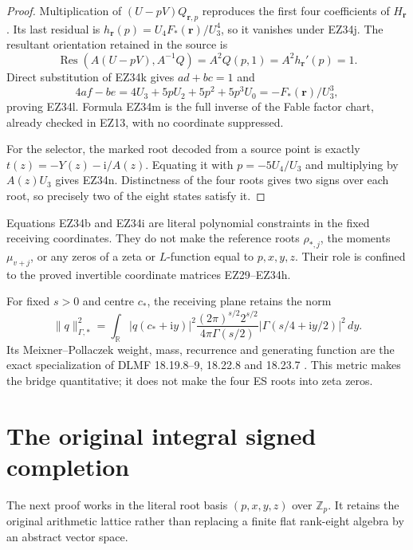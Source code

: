 \documentclass[11pt]{article}
\theoremstyle{definition}\newtheorem{definition}[theorem]{Definition}
\theoremstyle{remark}\newtheorem{remark}[theorem]{Remark}
\newcommand{\Res}{\operatorname{Res}}
\newcommand{\ii}{\mathrm i}
\begin{document}
\begin{proof}
Multiplication of \((U-pV)Q_{\mathbf r,p}\) reproduces the first four
coefficients of \(H_{\mathbf r}\).  Its last residual is
\(h_{\mathbf r}(p)=U_4F_*(\mathbf r)/U_3^4\), so it vanishes under EZ34j.
The resultant orientation retained in the source is
\[
 \Res(A(U-pV),A^{-1}Q)=A^2Q(p,1)=A^2h_{\mathbf r}'(p)=1.
\]
Direct substitution of EZ34k gives \(ad+bc=1\) and
\[
 4af-be=4U_3+5pU_2+5p^2+5p^3U_0
       =-F_*(\mathbf r)/U_3^3,
\]
proving EZ34l.  Formula EZ34m is the full inverse of the Fable factor chart,
already checked in EZ13, with no coordinate suppressed.

For the selector, the marked root decoded from a source point is exactly
\(t(z)=-Y(z)-\ii/A(z)\).  Equating it with
\(p=-5U_4/U_3\) and multiplying by \(A(z)U_3\) gives EZ34n.  Distinctness
of the four roots gives two signs over each root, so precisely two of the
eight states satisfy it.
\end{proof}

Equations EZ34b and EZ34i are literal polynomial constraints in the fixed
receiving coordinates.  They do not make the reference roots
\(\rho_{*,j}\), the moments \(\mu_{v+j}\), or any zeros of a zeta or
\(L\)-function equal to \(p,x,y,z\).  Their role is confined to the proved
invertible coordinate matrices EZ29--EZ34h.

For fixed \(s>0\) and centre \(c_*\), the receiving plane retains the norm
\begin{equation}
 \|q\|_{\Gamma,*}^2=
 \int_{\mathbb R}|q(c_*+\ii y)|^2
 \frac{(2\pi)^{s/2}2^{s/2}}{4\pi\Gamma(s/2)}
 |\Gamma(s/4+\ii y/2)|^2\,dy.                          \tag{EZ35}
\end{equation}
Its Meixner--Pollaczek weight, mass, recurrence and generating function are
the exact specialization of DLMF 18.19.8--9, 18.22.8 and 18.23.7
\cite{DLMF18}.  This metric makes the bridge quantitative; it does not make
the four ES roots into zeta zeros.







\clearpage
\section*{The original integral signed completion}

The next proof works in the literal root basis \((p,x,y,z)\) over
\(\mathbb Z_p\).  It retains the original arithmetic lattice rather than
replacing a finite flat rank-eight algebra by an abstract vector space.
\end{document}
